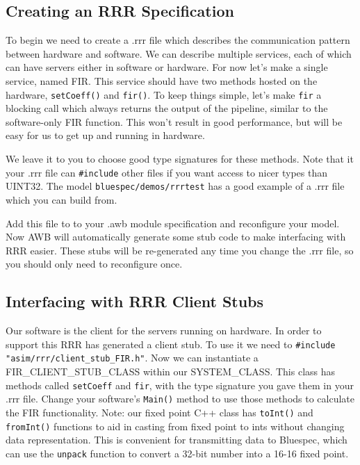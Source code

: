 \documentclass{article}
\begin{document}
\subsection{Creating an RRR Specification}

To begin we need to create a .rrr file which describes the communication pattern between hardware and software. We can describe
multiple services, each of which can have servers either in software or hardware. For now let's make a single service, named FIR.
This service should have two methods hosted on the hardware, \texttt{setCoeff()} and \texttt{fir()}. To keep things simple, let's
make \texttt{fir} a blocking call which always returns the output of the pipeline, similar to the software-only FIR function. This
won't result in good performance, but will be easy for us to get up and running in hardware.

We leave it to you to choose good type signatures for these methods. Note that it your .rrr file can \texttt{\#include} other files
if you want access to nicer types than UINT32. The model \texttt{bluespec/demos/rrrtest} has a good example of a .rrr file which you
can build from.

Add this file to to your .awb module specification and reconfigure your model. Now AWB will automatically generate some stub code to
make interfacing with RRR easier. These stubs will be re-generated any time you change the .rrr file, so you should only need to
reconfigure once.

\subsection{Interfacing with RRR Client Stubs}

Our software is the client for the servers running on hardware. In order to support this RRR has generated a client stub. To use it
we need to \texttt{\#include "asim/rrr/client\_stub\_FIR.h"}. Now we can instantiate a FIR\_CLIENT\_STUB\_CLASS within our
SYSTEM\_CLASS. This class has methods called \texttt{setCoeff} and \texttt{fir}, with the type signature you gave them in your .rrr
file. Change your software's \texttt{Main()} method to use those methods to calculate the FIR functionality. Note: our fixed point
C++ class has \texttt{toInt()} and \texttt{fromInt()} functions to aid in casting from fixed point to ints without changing data
representation. This is convenient for transmitting data to Bluespec, which can use the \texttt{unpack} function to convert a 32-bit
number into a 16-16 fixed point.
\end{document}
